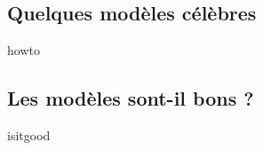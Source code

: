 \subsection{Quelques modèles célèbres}

{howto}



\subsection{Les modèles sont-il bons ?}

{isitgood}

